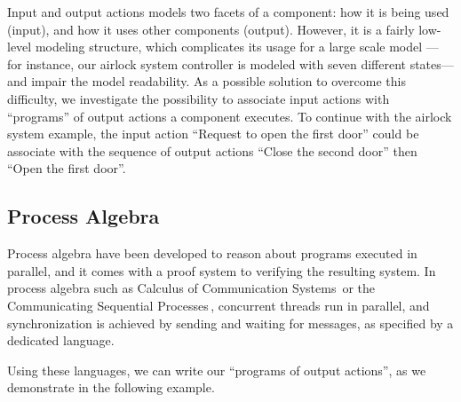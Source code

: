 Input and output actions models two facets of a component: how it is being used
(input), and how it uses other components (output).
%
However, it is a fairly low-level modeling structure, which complicates its
usage for a large scale model --- for instance, our airlock system controller is
modeled with seven different states--- and impair the model readability.
%
As a possible solution to overcome this difficulty, we investigate the
possibility to associate input actions with ``programs'' of output actions a
component executes.
%
To continue with the airlock system example, the input action ``Request to open
the first door'' could be associate with the sequence of output actions ``Close
the second door'' then ``Open the first door''.

\subsection{Process Algebra}
\label{subsec:sota:palgebra}

Process algebra have been developed to reason about programs executed in
parallel, and it comes with a proof system to verifying the resulting system.
%
In process algebra such as Calculus of Communication
Systems\,\cite{milner1980ccs} or the Communicating Sequential
Processes\,\cite{hoare1978csp}, concurrent threads run in parallel, and
synchronization is achieved by sending and waiting for messages, as specified by
a dedicated language.

Using these languages, we can write our ``programs of output actions'', as we
demonstrate in the following example.

